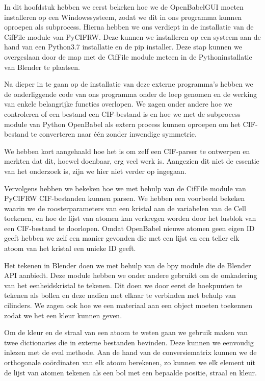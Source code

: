 In dit hoofdstuk hebben we eerst bekeken hoe we de OpenBabelGUI moeten installeren op een Windowssysteem, zodat we dit in ons programma kunnen oproepen als subprocess. Hierna hebben we ons verdiept in de installatie van de CifFile module van PyCIFRW. Deze kunnen we installeren op een systeem aan de hand van een Python3.7 installatie en de pip installer. Deze stap kunnen we overgeslaan door de map met de CifFile module meteen in de Pythoninstallatie van Blender te plaatsen.
\par
Na dieper in te gaan op de installatie van deze externe programma's hebben we de onderliggende code van ons programma onder de loep genomen en de werking van enkele belangrijke functies overlopen. We zagen onder andere hoe we controleren of een bestand een CIF-bestand is en hoe we met de subprocess module van Python OpenBabel als extern process kunnen oproepen om het CIF-bestand te converteren naar één zonder inwendige symmetrie. 
\par
We hebben kort aangehaald hoe het is om zelf een CIF-parser te ontwerpen en merkten dat dit, hoewel doenbaar, erg veel werk is. Aangezien dit niet de essentie van het onderzoek is, zijn we hier niet verder op ingegaan. 
\par 
Vervolgens hebben we bekeken hoe we met behulp van de CifFile module van PyCIFRW CIF-bestanden kunnen parsen. We hebben een voorbeeld bekeken waarin we de roosterparameters van een kristal aan de variabelen van de Cell toekenen, en hoe de lijst van atomen kan verkregen worden door het lusblok van een CIF-bestand te doorlopen. Omdat OpenBabel nieuwe atomen geen eigen ID geeft hebben we zelf een manier gevonden die met een lijst en een teller elk atoom van het kristal een unieke ID geeft.
\par 
Het tekenen in Blender doen we met behulp van de bpy module die de Blender API aanbiedt. Deze module hebben we onder andere gebruikt om de omkadering van het eenheidskristal te tekenen. Dit doen we door eerst de hoekpunten te tekenen als bollen en deze nadien met elkaar te verbinden met behulp van cilinders. We zagen ook hoe we een materiaal aan een object moeten toekennen zodat we het een kleur kunnen geven.
\par
Om de kleur en de straal van een atoom te weten gaan we gebruik maken van twee dictionaries die in externe bestanden bevinden. Deze kunnen we eenvoudig inlezen met de eval methode. Aan de hand van de conversiematrix kunnen we de orthogonale coördinaten van elk atoom berekenen, zo kunnen we elk element uit de lijst van atomen tekenen als een bol met een bepaalde positie, straal en kleur.
